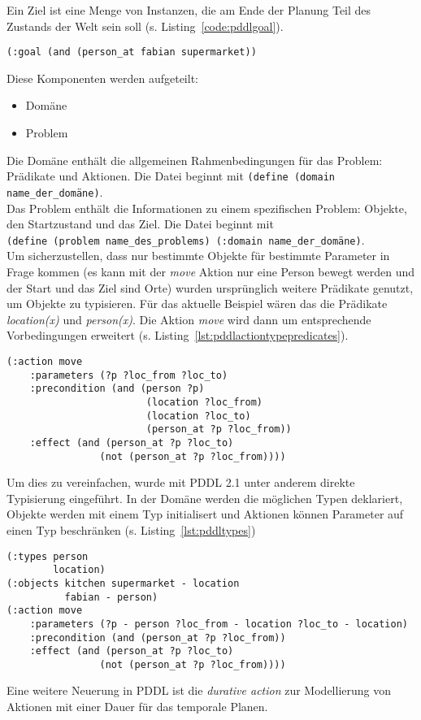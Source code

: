 Ein Ziel ist eine Menge von Instanzen, die am Ende der Planung Teil des Zustands der Welt sein soll (s. Listing~\ref{code:pddlgoal}).
\begin{lstlisting}[caption={Ziel in \acs{PDDL}},language=pddl,label=code:pddlgoal]
(:goal (and (person_at fabian supermarket))
\end{lstlisting}
Diese Komponenten werden aufgeteilt:
\begin{itemize}
    \item Domäne
    \item Problem
\end{itemize}
Die Domäne enthält die allgemeinen Rahmenbedingungen für das Problem: Prädikate und Aktionen.
Die Datei beginnt mit \verb|(define (domain name_der_domäne)|.\\
Das Problem enthält die Informationen zu einem spezifischen Problem: Objekte, den Startzustand und das Ziel.
Die Datei beginnt mit\\\verb|(define (problem name_des_problems) (:domain name_der_domäne)|.\\
Um sicherzustellen, dass nur bestimmte Objekte für bestimmte Parameter in Frage kommen (es kann mit der \emph{move} Aktion nur eine Person bewegt werden und der Start und das Ziel sind Orte) wurden ursprünglich weitere Prädikate genutzt, um Objekte zu typisieren.
Für das aktuelle Beispiel wären das die Prädikate \emph{location(x)} und \emph{person(x)}.
Die Aktion \emph{move} wird dann um entsprechende Vorbedingungen erweitert (s. Listing~\ref{lst:pddlactiontypepredicates}).
\begin{lstlisting}[caption={Move Aktion mit Prädikaten zur Typisierung},language=pddl,label={lst:pddlactiontypepredicates}]
(:action move
    :parameters (?p ?loc_from ?loc_to)
    :precondition (and (person ?p)
                        (location ?loc_from)
                        (location ?loc_to)
                        (person_at ?p ?loc_from))
    :effect (and (person_at ?p ?loc_to)
                (not (person_at ?p ?loc_from))))
\end{lstlisting}
Um dies zu vereinfachen, wurde mit \acs{PDDL} 2.1 unter anderem direkte Typisierung eingeführt.
In der Domäne werden die möglichen Typen deklariert, Objekte werden mit einem Typ initialisert und Aktionen können Parameter auf einen Typ beschränken (s. Listing~\ref{lst:pddltypes})
\begin{lstlisting}[caption={Typ Unterstützung in \acs{PDDL} 2.1},language=pddl,label={lst:pddltypes}]
(:types person
        location)
(:objects kitchen supermarket - location
          fabian - person)
(:action move
    :parameters (?p - person ?loc_from - location ?loc_to - location)
    :precondition (and (person_at ?p ?loc_from))
    :effect (and (person_at ?p ?loc_to)
                (not (person_at ?p ?loc_from))))
\end{lstlisting}
Eine weitere Neuerung in \ac{PDDL} ist die \emph{durative action} zur Modellierung von Aktionen mit einer Dauer für das temporale Planen.\\


